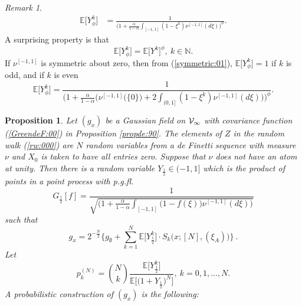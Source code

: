 \documentclass[preprint,11pt]{elsarticle}
\newtheorem{Proposition}{Proposition}
\theoremstyle{remark}
\newtheorem{Remark}{Remark}
\def\spin{{[-1,1]}}
\def\pgfl{\emph{p.g.fl.~}}
\begin{document}
{\begin{Remark}
\begin{align}
\mathbb{E}\big [Y_\phi^k] &= 
\frac{1}{\Big (1+\frac{\alpha}{1-\alpha}\int_{[-1,1]}(1-\xi^k)\nu^\spin(d\xi)\Big )^\phi}.
\nonumber
\end{align}
A surprising property is that
\begin{equation*}
\mathbb{E}\big [Y^k_\phi\big ] = \mathbb{E}\big [Y^k\big ]^\phi,\ k \in \mathbb{N}.
\label{idproperty:00}
\end{equation*}
If $\nu^\spin$ is symmetric about zero, then from (\ref{symmetric:01}), 
$\mathbb{E}\big [Y^k_\phi\big ]=1$ if $k$ is odd, and if $k$ is even
\begin{equation*}
\mathbb{E}\big [Y^k_\phi\big ]=
\frac{1}{
\Big (1+\frac{\alpha}{1-\alpha}
\big (\nu^\spin(\{0\}\big ) 
+ 2\int_{(0,1]}(1-\xi^k)\nu^\spin(d\xi)\big )\Big )^\phi
}.
\label{symmetry:002}
\end{equation*}
%
\end{Remark}
\begin{Proposition}\label{deF:340}
Let $(g_x)$ be a Gaussian field on ${\cal V}_\infty$ with covariance function (\ref{GreendeF:00}) in Proposition \ref{propde:90}. The elements of $Z$ in the random walk (\ref{rw:000}) are $N$ random variables from a de Finetti sequence with measure $\nu$ and $X_0$ is taken to have all entries zero.
Suppose that $\nu$ does not have an atom at unity. Then there is a random variable 
$Y_{ \frac{1}{2} }\in (-1,1]$ which is the product of points in a point process with \pgfl
\[
G_{\frac{1}{2}}[f] = 
\frac{1}{\sqrt{\Big (1+\frac{\alpha}{1-\alpha}\int_{[-1,1]}\big (1-f(\xi)\big)\nu^\spin(d\xi)\Big )}}
\]
such that
\begin{equation}
g_x
=  2^{-\frac{N}{2}}\Big \{g_\emptyset +
\sum_{k=1}^{N}
 \mathbb{E}\big [Y_{ \frac{1}{2} }^k\big ]
 \cdot S_k\big (x;[N],(\xi_A)\big )\Big \}\ .
\label{exchcirc:00ab}
\end{equation}
Let 
\begin{equation*}
p_k^{(N)} = {N\choose k}
\frac{\mathbb{E}\big [Y_{ \frac{1}{2} }^k\big ]}
{\mathbb{E}\big [\big ( 1 + Y_{ \frac{1}{2} }\big )^N\big ]},\ k=0,1,\ldots, N.
\label{pkN:00}
\end{equation*}
A probabilistic construction of $(g_x)$ is the following:

\end{Proposition}}
\end{document}
